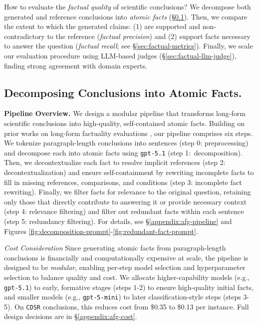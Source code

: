 \documentclass{article}
\newcommand{\xhdr}[1]{%
  \noindent\textbf{#1.}
}
\begin{document}
How to evaluate the \textit{factual quality} of scientific conclusions?
We decompose both generated and reference conclusions into \textit{atomic facts} (\S\ref{sec:atomic-fact-gen}).
Then, we compare the extent to which the generated claims: (1) are supported and non-contradictory to the reference (\textit{factual precision}) and (2) support facts necessary to answer the question (\textit{factual recall}; see  \S\ref{sec:factual-metrics}).
Finally, we scale our evaluation procedure using LLM-based judges (\S\ref{sec:factual-llm-judge}), finding strong agreement with domain experts.


\subsection{Decomposing Conclusions into Atomic Facts.}\label{sec:atomic-fact-gen}

\xhdr{Pipeline Overview} We design a modular pipeline that transforms long-form scientific conclusions 
into high-quality, self-contained atomic facts. Building on prior works on long-form factuality evaluations \cite{liu-etal-2025-verifact, min-etal-2023-factscore, 10.5555/3737916.3740483}, our pipeline comprises six steps.
We tokenize paragraph-length conclusions into sentences (step 0: preprocessing) and decompose each into atomic facts using \texttt{gpt-5.1} (step 1:~decomposition).
Then, we decontextualize each fact to resolve implicit references (step 2: decontextualization) and ensure self-containment by rewriting incomplete facts to fill in missing references, comparisons, and conditions (step 3: incomplete fact rewriting).
Finally, we filter facts for relevance to the original question, retaining only those that directly contribute to answering it or provide necessary context (step 4:  relevance filtering) and
filter out redundant facts within each sentence (step 5: redundancy filtering).
For details, see \S\ref{appendix:afg-pipeline} and Figures \ref{fig:decomposition-prompt}-\ref{fig:redundant-fact-prompt}.


\textit{Cost Consideration} Since generating atomic facts from paragraph-length conclusions is financially and computationally expensive at scale, the pipeline is designed to be \textit{modular}, enabling per-step model selection and hyperparameter selection to balance quality and cost. We allocate higher-capability models (e.g., \texttt{gpt-5.1}) to early, formative stages (steps 1-2) to ensure high-quality initial facts, and smaller models (e.g., \texttt{gpt-5-mini}) to later classification-style steps (steps 3-5). On \texttt{CDSR} conclusions, this reduces cost from \$0.35 to \$0.13 per instance. Full design decisions are in \S\ref{appendix:afg-cost}.
\end{document}

